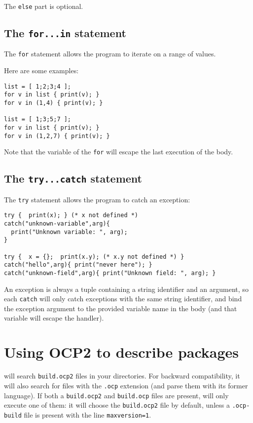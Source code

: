 The \verb+else+ part is optional.

\subsection{The {\tt for...in} statement}

The \verb+for+ statement allows the program to iterate on a range of values.

Here are some examples:
\begin{verbatim}
list = [ 1;2;3;4 ];
for v in list { print(v); }
for v in (1,4) { print(v); }

list = [ 1;3;5;7 ];
for v in list { print(v); }
for v in (1,2,7) { print(v); }
\end{verbatim}

Note that the variable of the \verb+for+ will escape the last
execution of the body.

\subsection{The {\tt try...catch} statement}

The \verb+try+ statement allows the program to catch an exception:

\begin{verbatim}
try {  print(x); } (* x not defined *)
catch("unknown-variable",arg){
  print("Unknown variable: ", arg);
}

try {  x = {};  print(x.y); (* x.y not defined *) }
catch("hello",arg){ print("never here"); }
catch("unknown-field",arg){ print("Unknown field: ", arg); }
\end{verbatim}

An exception is always a tuple containing a string identifier and an
argument, so each {\tt catch} will only catch exceptions with the same
string identifier, and bind the exception argument to the provided
variable name in the body (and that variable will escape the handler).

\section{Using OCP2 to describe packages}

\ocpbuild{} will search {\tt build.ocp2} files in your
directories. For backward compatibility, it will also search for files
with the {\tt .ocp} extension (and parse them with its former
language). If both a {\tt build.ocp2} and {\tt build.ocp} files are
present, \ocpbuild{} will only execute one of them: it will choose the
{\tt build.ocp2} file by default, unless a {\tt .ocp-build} file is
present with the line {\tt maxversion=1}.

